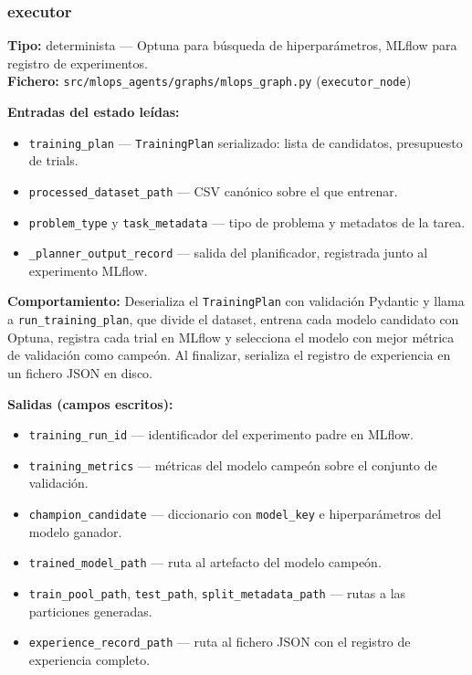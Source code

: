 \subsubsection*{executor}
\label{sec:nodo-executor}

\textbf{Tipo:} determinista --- Optuna para búsqueda de hiperparámetros, MLflow para registro de experimentos.\\
\textbf{Fichero:} \texttt{src/mlops\_agents/graphs/mlops\_graph.py} (\texttt{executor\_node})

\textbf{Entradas del estado leídas:}
\begin{itemize}
  \item \texttt{training\_plan} — \texttt{TrainingPlan} serializado: lista de candidatos, presupuesto de trials.
  \item \texttt{processed\_dataset\_path} — CSV canónico sobre el que entrenar.
  \item \texttt{problem\_type} y \texttt{task\_metadata} — tipo de problema y metadatos de la tarea.
  \item \texttt{\_planner\_output\_record} — salida del planificador, registrada junto al experimento MLflow.
\end{itemize}

\textbf{Comportamiento:} Deserializa el \texttt{TrainingPlan} con validación Pydantic y llama a \texttt{run\_training\_plan}, que divide el dataset, entrena cada modelo candidato con Optuna, registra cada trial en MLflow y selecciona el modelo con mejor métrica de validación como campeón. Al finalizar, serializa el registro de experiencia en un fichero JSON en disco.

\textbf{Salidas (campos escritos):}
\begin{itemize}
  \item \texttt{training\_run\_id} — identificador del experimento padre en MLflow.
  \item \texttt{training\_metrics} — métricas del modelo campeón sobre el conjunto de validación.
  \item \texttt{champion\_candidate} — diccionario con \texttt{model\_key} e hiperparámetros del modelo ganador.
  \item \texttt{trained\_model\_path} — ruta al artefacto del modelo campeón.
  \item \texttt{train\_pool\_path}, \texttt{test\_path}, \texttt{split\_metadata\_path} — rutas a las particiones generadas.
  \item \texttt{experience\_record\_path} — ruta al fichero JSON con el registro de experiencia completo.
\end{itemize}

